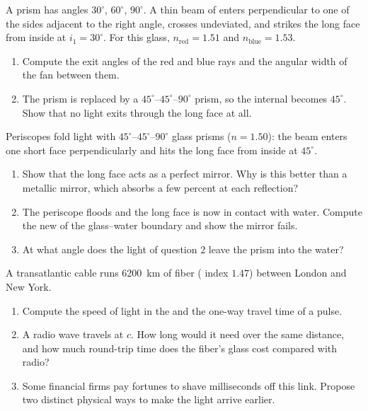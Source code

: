 \begin{exercise}[$\star\star\star$]\label{exo:g10:refraction:13}
A prism has angles $30^\circ$, $60^\circ$, $90^\circ$. A thin beam of
 enters perpendicular to one of the sides adjacent to the right angle,
crosses undeviated, and strikes the long face from inside at
$i_1 = 30^\circ$. For this glass, $n_{\text{red}} = 1.51$ and
$n_{\text{blue}} = 1.53$.
\begin{enumerate}
  \item Compute the exit angles of the red and blue rays and the angular
        width of the fan between them.
  \item The prism is replaced by a $45^\circ$--$45^\circ$--$90^\circ$
        prism, so the internal  becomes $45^\circ$.
        Show that no light exits through the long face at all.
\end{enumerate}
\end{exercise}

\begin{exercise}[$\star\star\star$]\label{exo:g10:refraction:14}
Periscopes fold light with $45^\circ$--$45^\circ$--$90^\circ$ glass
prisms ($n = 1.50$): the beam enters one short face perpendicularly and
hits the long face from inside at $45^\circ$.
\begin{enumerate}
  \item Show that the long face acts as a perfect mirror. Why is this
        better than a metallic mirror, which absorbs a few percent at
        each reflection?
  \item The periscope floods and the long face is now in contact with
        water. Compute the new  of the glass--water
        boundary and show the mirror fails.
  \item At what angle does the light of question 2 leave the prism into
        the water?
\end{enumerate}
\end{exercise}

\begin{exercise}[$\star\star\star$]\label{exo:g10:refraction:15}
A transatlantic cable runs \qty{6200}{km} of fiber ( index $1.47$)
between London and New York.
\begin{enumerate}
  \item Compute the speed of light in the  and the one-way travel
        time of a pulse.
  \item A radio wave travels at $c$. How long would it need over the
        same distance, and how much round-trip time does the fiber's
        glass cost compared with radio?
  \item Some financial firms pay fortunes to shave milliseconds off this
        link. Propose two distinct physical ways to make the light
        arrive earlier.
\end{enumerate}
\end{exercise}

